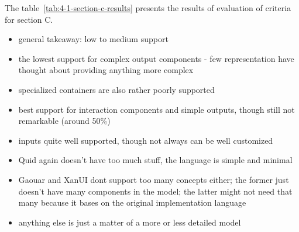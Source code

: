 The table~\ref{tab:4-1-section-c-results} presents the results of evaluation of criteria for section C\@.
\begin{itemize}
    \item general takeaway: low to medium support
    \item the lowest support for complex output components - few representation have thought about providing anything more complex
    \item specialized containers are also rather poorly supported
    \item best support for interaction components and simple outputs, though still not remarkable (around 50\%)
    \item inputs quite well supported, though not always can be well customized
\end{itemize}
\begin{itemize}
    \item Quid again doesn't have too much stuff, the language is simple and minimal
    \item Gaouar and XanUI dont support too many concepts either; the former just doesn't have many components in the model; the latter might not need that many because it bases on the original implementation language
    \item anything else is just a matter of a more or less detailed model
\end{itemize}

